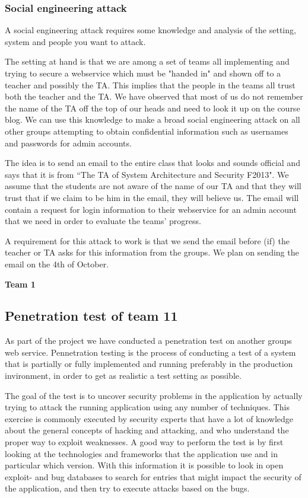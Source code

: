 \documentclass[a4paper]{article}
\begin{document}
\subsubsection{Social engineering attack}
A social engineering attack requires some knowledge and analysis of the setting, system and people you want to attack.

The setting at hand is that we are among a set of teams all implementing and trying to secure a webservice which must be "handed in" and shown off to a teacher and possibly the TA. This implies that the people in the teams all trust both the teacher and the TA. We have observed that most of us do not remember the name of the TA off the top of our heads and need to look it up on the course blog.
We can use this knowledge to make a broad social engineering attack on all other groups attempting to obtain confidential information such as usernames and passwords for admin accounts.

The idea is to send an email to the entire class that looks and sounds official and says that it is from ``The TA of System Architecture and Security F2013". We assume that the students are not aware of the name of our TA and that they will trust that if we claim to be him in the email, they will believe us. The email will contain a request for login information to their webservice for an admin account that we need in order to evaluate the teams' progress.

A requirement for this attack to work is that we send the email before (if) the teacher or TA asks for this information from the groups. We plan on sending the email on the 4th of October.


\textbf{Team 1}

\subsection{Penetration test of team 11}
As part of the project we have conducted a penetration test on another groups web service.
Pennetration testing is the process of conducting a test of a system that is partially or fully implemented and running preferably in the production invironment, in order to get as realistic a test setting as possible.

The goal of the test is to uncover security problems in the application by actually trying to attack the running application using any number of techniques. This exercise is commonly executed by security experts that have a lot of knowledge about the general concepts of hacking and attacking, and who understand the proper way to exploit weaknesses. 
A good way to perform the test is by first looking at the technologies and frameworks that the application use and in particular which version. With this information it is possible to look in open exploit- and bug databases to search for entries that might impact the security of the application, and then try to execute attacks based on the bugs.
\end{document}
